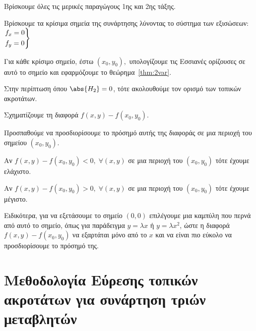 \documentclass[a4paper,table]{report}
\begin{document}
\begin{enumerate}
  \item Βρίσκουμε όλες τις μερικές παραγώγους 1ης και 2ης τάξης.
  \item Βρίσκουμε τα κρίσιμα σημεία της συνάρτησης λύνοντας το σύστημα των εξισώσεων: 
    $ \begin{rcases}
      f_{x} = 0 \\
      f_{y} = 0  
    \end{rcases} $
  \item Για κάθε κρίσιμο σημείο, έστω $ (x_{0}, y_{0}), $ υπολογίζουμε τις Εσσιανές 
    ορίζουσες σε αυτό το σημείο και εφαρμόζουμε το θεώρημα~\ref{thm:2var}.
  \item Στην περίπτωση όπου $ \abs{H_{2}} = 0 $, τότε ακολουθούμε τον ορισμό των 
    τοπικών ακροτάτων.
    \begin{myitemize}
      \item Σχηματίζουμε τη διαφορά $ f(x,y) - f(x_{0}, y_{0}) $.
      \item Προσπαθούμε να προσδιορίσουμε το πρόσημό αυτής της διαφοράς σε 
        μια περιοχή του σημείου $ (x_{0}, y_{0}) $.
        \begin{myitemize}
          \item Αν $ f(x,y) - f(x_{0}, y_{0}) < 0, \; \forall (x,y) $ σε μια
            περιοχή του $ (x_{0}, y_{0}) $ τότε έχουμε ελάχιστο. 
          \item Αν $ f(x,y) - f(x_{0}, y_{0}) > 0, \; \forall (x,y) $ σε μια
            περιοχή του $ (x_{0}, y_{0}) $ τότε έχουμε μέγιστο. 
        \end{myitemize}
      \item Ειδικότερα, για να εξετάσουμε το σημείο $ (0,0) $ επιλέγουμε μια 
        καμπύλη που περνά από αυτό το σημείο, όπως για παράδειγμα 
        $ y= \lambda x $ ή $ y= \lambda x^{2} $, ώστε η διαφορά 
        $ f(x,y) - f(x_{0}, y_{0}) $ να εξαρτάται μόνο από το $x$ και να 
        είναι πιο εύκολο να προσδιορίσουμε το πρόσημό της.
    \end{myitemize}
\end{enumerate}

\section{Μεθοδολογία Εύρεσης τοπικών ακροτάτων για συνάρτηση τριών μεταβλητών}
\end{document}
